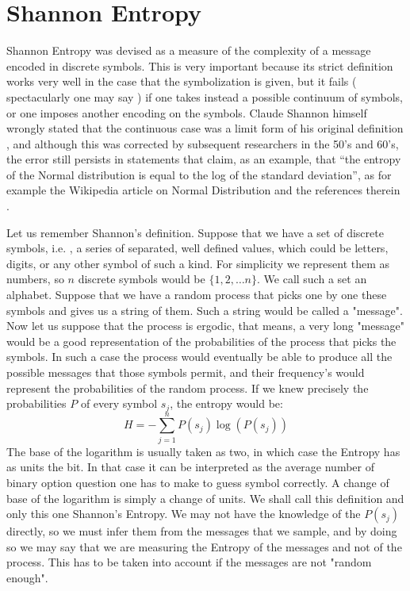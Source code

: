 \documentclass[10pt]{article}
\begin{document}
\section{Shannon Entropy}


Shannon Entropy was devised as a measure of the complexity of a message encoded in discrete symbols. This is very important because its strict definition works very well in the case that the symbolization is given, but it fails ( spectacularly one may say ) if one takes instead a possible continuum of symbols, or one imposes another encoding on the symbols. Claude Shannon himself wrongly stated that the continuous case was a limit form
of his original definition \cite{Shannon1948}, and although this was corrected
by subsequent researchers in the 50's and 60's, the error still persists in statements
that claim, as an example, that ``the entropy of the Normal distribution is equal
to the log of the standard deviation'', as for example the Wikipedia article on
Normal Distribution and the references therein \cite{WikiNormal}. 


Let us remember Shannon's definition. Suppose that we have a set of discrete symbols, i.e. , a series of separated, well defined values, which could be letters, digits, or any other symbol of such a kind. For simplicity we represent them as numbers, so $n$ discrete symbols would be $\{1, 2, \ldots n \}$. We call such a set an alphabet. Suppose that we have a random process that picks one by one these symbols and gives us a string of them. Such a string would be called a "message". Now let us suppose that the process is ergodic, that means, a very long "message" would be a good representation of the probabilities of the process that picks the symbols. In such a case the process would eventually be able to produce all the possible messages that those symbols permit, and their frequency's would represent the probabilities of the random process. If we knew precisely the probabilities $P$ of every symbol $s_j$, the entropy would be:
\begin{equation}\label{eqDiffEnt}
  H=-\sum_{j=1}^n P(s_j) \log (P (s_j))
\end{equation}
The base of the logarithm is usually taken as two, in which case the Entropy has as units the bit. In that case it can be interpreted as the average number of binary option question one has to make to guess symbol correctly.  A change of base of the logarithm is simply a change of units. We shall call this definition and only this one Shannon's Entropy.
We may not have the knowledge of the $P(s_j)$ directly, so we must infer them from the messages that we sample, and by doing so we may say that we are measuring the Entropy of the messages and not of the process. This has to be taken into account if the messages are not "random enough".
\end{document}

